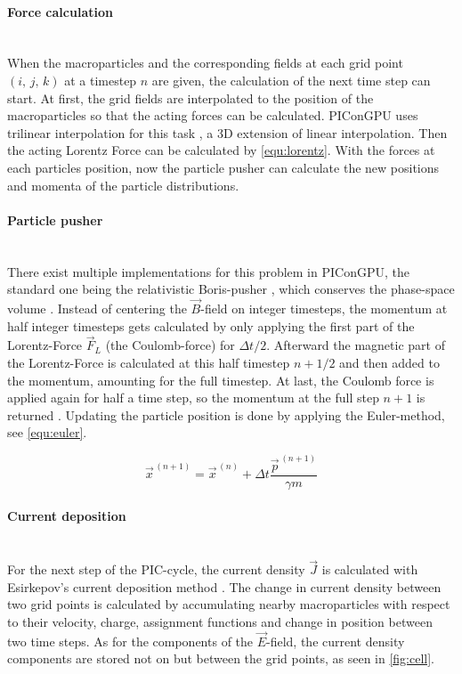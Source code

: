 \documentclass[bachelor_thesis]{subfiles}
\begin{document}
\paragraph*{Force calculation}\hspace{0pt} \\
When the macroparticles and the corresponding fields at each grid point $(i, \, j, \,k)$ at a timestep $n$ are given, the calculation of the next time step can start.
At first, the grid fields are interpolated to the position of the macroparticles so that the acting forces can be calculated. PIConGPU uses trilinear interpolation for this task \cite{Huebl2019, PICRepo}, a 3D extension of linear interpolation.
Then the acting Lorentz Force can be calculated by \autoref{equ:lorentz}. With the forces at each particles position, now the particle pusher can calculate the new positions and momenta of the particle distributions.

\paragraph*{Particle pusher}\hspace{0pt} \\
There exist multiple implementations for this problem in PIConGPU, the standard one being the relativistic Boris-pusher \cite{Boris1970}, which conserves the phase-space volume \cite{PICRepo}. Instead of centering the $\vec{B}$-field on integer timesteps, the momentum at half integer timesteps gets
calculated by only applying the first part of the Lorentz-Force $\vec{F}_L$ (the Coulomb-force) for $\Delta t/2$. Afterward the magnetic part of the Lorentz-Force is calculated at this half timestep $n+1/2$ and then added to the momentum, amounting for the full timestep.
At last, the Coulomb force is applied again for half a time step, so the momentum at the full step $n+1$ is returned \cite{Zenitani2018, Pausch2019}. Updating the particle position is done by applying the Euler-method, see \autoref{equ:euler}.

\begin{equation}
	\vec{x}^{\,(n+1)} = \vec{x}^{\,(n)} + \Delta t \frac{\vec{p}^{\,(n+1)}}{\gamma m}
	\label{equ:euler}
\end{equation}

\paragraph*{Current deposition}\hspace{0pt} \\
For the next step of the PIC-cycle, the current density $\vec{J}$ is calculated with Esirkepov’s current deposition method \cite{Esirkepov2001}.
The change in current density between two grid points is calculated by accumulating nearby macroparticles with respect to their velocity, charge, assignment functions and change in position between two time steps. 
As for the components of the $\vec{E}$-field, the current density components are stored not on but between the grid points, as seen in \autoref{fig:cell}.
\end{document}
